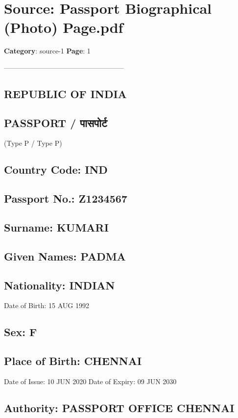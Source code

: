 \section*{Source: Passport Biographical (Photo) Page.pdf}
\textbf{Category}: source-1
\textbf{Page}: 1

-----------------------------------------------------

\subsection*{REPUBLIC OF INDIA}

\subsection*{PASSPORT / पासपोर्ट}

(Type P / Type P)

\subsection*{Country Code: IND}

\subsection*{Passport No.: Z1234567}

\subsection*{Surname: KUMARI}

\subsection*{Given Names: PADMA}

\subsection*{Nationality: INDIAN}

Date of Birth: 15 AUG 1992

\subsection*{Sex: F}

\subsection*{Place of Birth: CHENNAI}

Date of Issue: 10 JUN 2020 Date of Expiry: 09 JUN 2030

\subsection*{Authority: PASSPORT OFFICE CHENNAI}